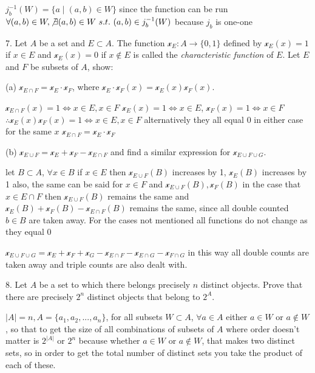 $j_{b}^{-1}(W) = \{ a \mid (a, b) \in W\}$ since the function can be run $\forall (a, b) \in W, \not \exists (a, b) \in W\ s.t.\ (a,b) \in j_{b}^{-1}(W)$ because $j_{b}$ is one-one

7. Let $A$ be a set and $E \subset A$. The function $\mathscr{x}_{E}: A \rightarrow \{ 0, 1\}$ defined by $\mathscr{x}_{E}(x) = 1$ if $x \in E$ and $\mathscr{x}_{E}(x) = 0$ if $x \not \in E$ is called the \textit{characteristic function} of $E$. Let $E$ and $F$ be subsets of $A$, show:

(a) $\mathscr{x}_{E \cap F} = \mathscr{x}_{E}\cdot \mathscr{x}_{F}$, where $\mathscr{x}_{E} \cdot \mathscr{x}_{F}(x) = \mathscr{x}_{E}(x) \mathscr{x}_F(x)$. 

$\mathscr{x}_{E\cap F}(x) = 1 \iff  x \in E, x \in F$
$\mathscr{x}_{E}(x) = 1 \iff x \in E$, $\mathscr{x}_{F}(x) = 1 \iff x \in F$
$\therefore \mathscr{x}_{E}(x) \mathscr{x}_F(x) = 1 \iff x \in E, x \in F$
alternatively they all equal $0$ in either case for the same $x$ $\mathscr{x}_{E \cap F} = \mathscr{x}_{E}\cdot \mathscr{x}_{F}$

(b) $\mathscr{x}_{E \cup F} = \mathscr{x}_{E} + \mathscr{x}_{F} - \mathscr{x}_{E \cap F}$ and find a similar expression for $\mathscr{x}_{E \cup F \cup G}$.

let $B \subset A$, 
$\forall x \in B$ if $x \in E$ then $\mathscr{x}_{E \cup F}(B) $ increases by 1, $\mathscr{x}_{E}(B)$ increases by 1 also, the same can be said for $x \in F$ and $\mathscr{x}_{E \cup F}(B) , \mathscr{x}_{F}(B)$
in the case that $x \in E \cap F$ then $\mathscr{x}_{E \cup F}(B)$ remains the same and $\mathscr{x}_{E}(B) + \mathscr{x}_{F}(B) - \mathscr{x}_{E \cap F}(B)$ remains the same, since all double counted $b \in B$ are taken away.
For the cases not mentioned all functions do not change as they equal $0$

$\mathscr{x}_{E \cup F \cup G} = \mathscr{x}_{E} + \mathscr{x}_{F} +  \mathscr{x}_{G} - \mathscr{x}_{E \cap F} - \mathscr{x}_{E \cap G} - \mathscr{x}_{F \cap G}$ in this way all double counts are taken away and triple counts are also dealt with.

8. Let $A$ be a set to which there belongs precisely $n$ distinct objects. Prove that there are precisely $2^n$ distinct objects that belong to $2^{A}$.

$\lvert{A}\rvert = n, A = \{a_{1}, a_{2}, ..., a_{n} \}$, for all subsets $W \subset A$, 
$\forall a \in A$ either $a \in W$ or $a \not \in W$, so that to get the size of all combinations of subsets of $A$ where order doesn't matter is $2^{\lvert{A}\rvert}$ or $2^{n}$ because whether $a \in W$ or $a \not \in W$, that makes two distinct sets, so in order to get the total number of distinct sets you take the product of each of these.



